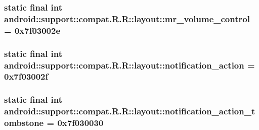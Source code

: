 \hypertarget{classandroid_1_1support_1_1compat_1_1_r_1_1layout_ad98d7c6fc98f7515d2153b31bd7ac53}{
\subsubsection[{mr\_\-volume\_\-control}]{\setlength{\rightskip}{0pt plus 5cm}static final int android::support::compat.R.R::layout::mr\_\-volume\_\-control = 0x7f03002e}}
\label{classandroid_1_1support_1_1compat_1_1_r_1_1layout_ad98d7c6fc98f7515d2153b31bd7ac53}


\hypertarget{classandroid_1_1support_1_1compat_1_1_r_1_1layout_a3e1aa772f52d4848999150338f752d9}{
\subsubsection[{notification\_\-action}]{\setlength{\rightskip}{0pt plus 5cm}static final int android::support::compat.R.R::layout::notification\_\-action = 0x7f03002f}}
\label{classandroid_1_1support_1_1compat_1_1_r_1_1layout_a3e1aa772f52d4848999150338f752d9}


\hypertarget{classandroid_1_1support_1_1compat_1_1_r_1_1layout_ef470cdcf325d96b80bd1756f35c2f4c}{
\subsubsection[{notification\_\-action\_\-tombstone}]{\setlength{\rightskip}{0pt plus 5cm}static final int android::support::compat.R.R::layout::notification\_\-action\_\-tombstone = 0x7f030030}}
\label{classandroid_1_1support_1_1compat_1_1_r_1_1layout_ef470cdcf325d96b80bd1756f35c2f4c}


